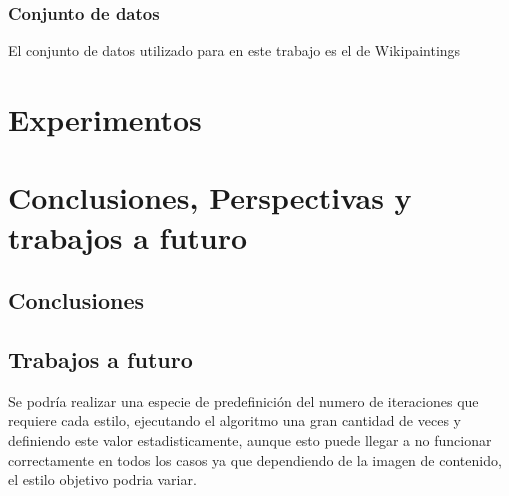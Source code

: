 \documentclass[a4paper,11pt,spanish]{book}
\begin{document}
    \subsection{Conjunto de datos}
      El conjunto de datos utilizado para en este trabajo es el de Wikipaintings
    
      
\chapter{Experimentos}
\chapter{Conclusiones, Perspectivas y trabajos a futuro}
  \section{Conclusiones}
  \section{Trabajos a futuro}
    Se podría realizar una especie de predefinición del numero de iteraciones que requiere cada estilo, ejecutando el algoritmo una gran cantidad de veces y definiendo este valor 
    estadisticamente, aunque esto puede llegar a no funcionar correctamente en todos los casos ya que dependiendo de la imagen de contenido, el estilo objetivo podria variar.
\printindex
\end{document}
